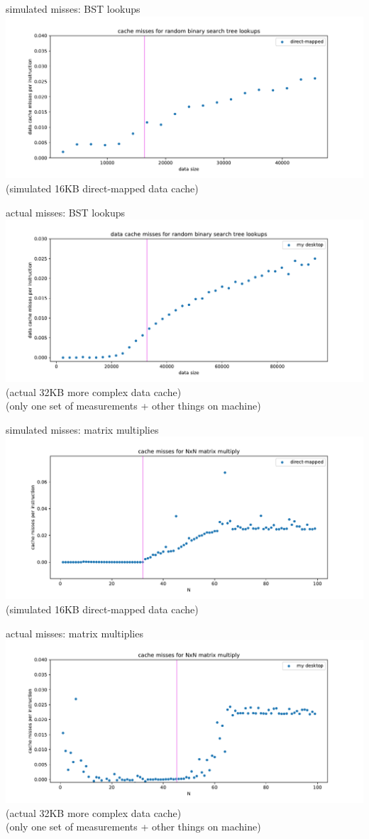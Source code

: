\begin{frame}{simulated misses: BST lookups}
\includegraphics[width=\textwidth]{../caching/bst-one}
(simulated 16KB direct-mapped data cache)
\end{frame}

\begin{frame}{actual misses: BST lookups}
\includegraphics[width=\textwidth]{../caching/bst-act}
(actual 32KB more complex data cache) \\
\small (only one set of measurements + other things on machine)
\end{frame}


\begin{frame}{simulated misses: matrix multiplies}
\includegraphics[width=\textwidth]{../caching/mm-one}
(simulated 16KB direct-mapped data cache)
\end{frame}

\begin{frame}{actual misses: matrix multiplies}
\includegraphics[width=\textwidth]{../caching/mm-act}
(actual 32KB more complex data cache) \\
\small (only one set of measurements + other things on machine)
\end{frame}
